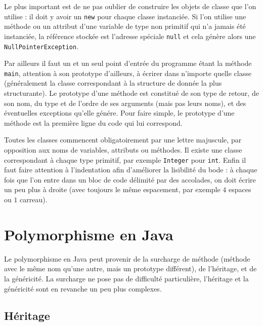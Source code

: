 \documentclass[10pt]{article}
\begin{document}
Le plus important est de ne pas oublier de construire les objets de classe
que l'on utilise : il doit y avoir un \texttt{new} pour chaque classe instanciée.
Si l'on utilise une méthode ou un attribut d'une variable de type non primitif
qui n'a jamais été instanciée, la référence stockée est l'adresse spéciale \texttt{null}
et cela génère alors une \texttt{NullPointerException}.

Par ailleurs il faut un et un seul point d'entrée du programme étant la méthode \texttt{main},
attention à son prototype d'ailleurs,
à écrirer dans n'importe quelle classe (généralement la classe correspondant à la structure
de donnée la plus structurante). Le prototype d'une méthode est constitué de son type de retour,
de son nom, du type et de l'ordre de ses arguments (mais pas leurs noms), et des éventuelles exceptions
qu'elle génére. Pour faire simple, le prototype d'une méthode est la première ligne du code qui lui correspond.

Toutes les classes commencent obligatoirement par une lettre majuscule,
par opposition aux noms de variables, attributs ou méthodes. Il existe une classe correspondant à chaque type primitif, par exemple
\texttt{Integer} pour \texttt{int}. Enfin il faut faire attention à l'indentation afin d'améliorer la lisibilité du bode :
à chaque fois que l'on entre dans un bloc de code délimité par des accolades, on doit écrire un peu plus à droite (avec toujours
le même espacement, par exemple $4$ espaces ou $1$ carreau).


\section{Polymorphisme en Java}
\label{sec.heritage}

Le polymorphisme en Java peut provenir de la surcharge de méthode (méthode avec le même nom qu'une autre, mais un prototype différent),
de l'héritage, et de la généricité. La surcharge ne pose pas de difficulté particulière, l'héritage et la généricité sont en revanche un
peu plus complexes.

\subsection{Héritage}
\end{document}
